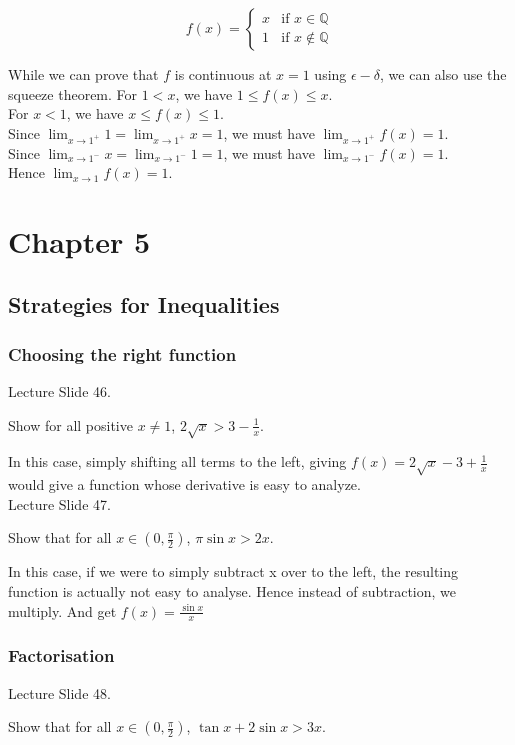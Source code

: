 \documentclass{article}
\begin{document}
$$f(x)=
\begin{cases}
x &\text{if }x\in \mathbb{Q}\\
1 &\text{if }x\notin \mathbb{Q}
\end{cases}
$$

While we can prove that $f$ is continuous at $x=1$ using $\epsilon-\delta$, we can also use the squeeze theorem.
For $1<x$, we have $1\leq f(x)\leq x$.\\
For $x<1$, we have $x\leq f(x)\leq 1$.\\
Since $\lim_{x\rightarrow 1^+}1=\lim_{x\rightarrow 1^+}x=1$, we must have $\lim_{x\rightarrow 1^+}f(x)=1$.\\
Since $\lim_{x\rightarrow 1^-}x=\lim_{x\rightarrow 1^-}1=1$, we must have $\lim_{x\rightarrow 1^-}f(x)=1$.\\
Hence $\lim_{x\rightarrow 1}f(x)=1$.

\section{Chapter 5}
\subsection{Strategies for Inequalities}
\subsubsection{Choosing the right function}
Lecture Slide 46.

Show for all positive $x\neq 1$, $2\sqrt{x}>3-\frac{1}{x}$.

In this case, simply shifting all terms to the left, giving $f(x)=2\sqrt{x}-3+\frac{1}{x}$ would give a function whose derivative is easy to analyze.\\

Lecture Slide 47.

Show that for all $x\in(0,\frac{\pi}{2})$, $\pi \sin x>2x$.

In this case, if we were to simply subtract x over to the left, the resulting function is actually not easy to analyse. Hence instead of subtraction, we multiply. And get $f(x)=\frac{\sin x}{x}$

\subsubsection{Factorisation}
Lecture Slide 48.

Show that for all $x\in (0,\frac{\pi}{2})$, $\tan x+2\sin x>3x$.
\end{document}
